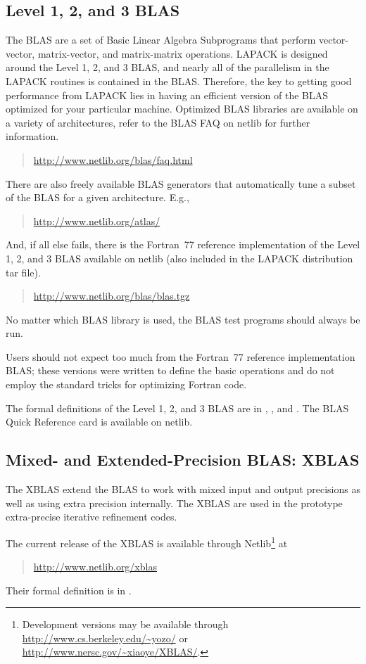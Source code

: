 \documentclass[11pt]{report}
\begin{document}
\subsection{Level 1, 2, and 3 BLAS}

The BLAS are a set of Basic Linear Algebra Subprograms that perform
vector-vector, matrix-vector, and matrix-matrix operations. 
LAPACK is designed around the Level 1, 2, and 3 BLAS, and nearly all
of the parallelism in the LAPACK routines is contained in the BLAS.
Therefore,
the key to getting good performance from LAPACK lies in having an
efficient version of the BLAS optimized for your particular machine. 
Optimized BLAS libraries are available on a variety of architectures,
refer to the BLAS FAQ on netlib for further information.
\begin{quote}
\url{http://www.netlib.org/blas/faq.html}
\end{quote}
There are also freely available BLAS generators that automatically
tune a subset of the BLAS for a given architecture.  E.g.,
\begin{quote}
\url{http://www.netlib.org/atlas/}
\end{quote}
And, if all else fails, there is the Fortran~77 reference implementation
of the Level 1, 2, and 3 BLAS available on netlib (also included in
the LAPACK distribution tar file).
\begin{quote}
\url{http://www.netlib.org/blas/blas.tgz}
\end{quote}
No matter which BLAS library is used, the BLAS test programs should
always be run.

Users should not expect too much from the Fortran~77 reference implementation
BLAS; these versions were written to define the basic operations and do not
employ the standard tricks for optimizing Fortran code.

The formal definitions of the Level 1, 2, and 3 BLAS
are in \cite{BLAS1}, \cite{BLAS2}, and \cite{BLAS3}. 
The BLAS Quick Reference card is available on netlib.

\subsection{Mixed- and Extended-Precision BLAS: XBLAS}

The XBLAS extend the BLAS to work with mixed input and output
precisions as well as using extra precision internally.  The XBLAS are
used in the prototype extra-precise iterative refinement codes.

The current release of the XBLAS is available through
Netlib\footnote{Development versions may be available through
  \url{http://www.cs.berkeley.edu/~yozo/} or
  \url{http://www.nersc.gov/~xiaoye/XBLAS/}.}  at
\begin{quote}
  \url{http://www.netlib.org/xblas}
\end{quote}
Their formal definition is in \cite{XBLAS}.
\end{document}
